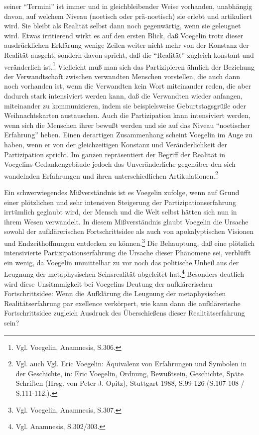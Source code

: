 seiner "`Termini"' ist immer und in gleichbleibender Weise vorhanden,
unabhängig davon, auf welchem Niveau (noetisch oder prä-noetisch) sie
erlebt und artikuliert wird. Sie bleibt als Realität selbst dann noch
gegenwärtig, wenn sie geleugnet wird.  Etwas irritierend wirkt es auf
den ersten Blick, daß Voegelin trotz dieser ausdrücklichen Erklärung
wenige Zeilen weiter nicht mehr von der Konstanz der Realität ausgeht,
sondern davon spricht, daß die "`Realität"' zugleich konstant und
veränderlich ist.\footnote{Vgl. Voegelin, Anamnesis, S.306.}  Vielleicht
muß man sich das Partizipieren ähnlich der Beziehung der Verwandtschaft
zwischen verwandten Menschen vorstellen, die auch dann noch vorhanden
ist, wenn die Verwandten kein Wort miteinander reden, die aber dadurch
stark intensiviert werden kann, daß die Verwandten wieder anfangen,
miteinander zu kommunizieren, indem sie beispielsweise Geburtstagsgrüße
oder Weihnachtskarten austauschen. Auch die Partizipation kann
intensiviert werden, wenn sich die Menschen ihrer bewußt werden und sie
auf das Niveau "`noetischer Erfahrung"' heben.  Einen derartigen
Zusammenhang scheint Voegelin im Auge zu haben, wenn er von der
gleichzeitigen Konstanz und Veränderlichkeit der Partizipation spricht.
Im ganzen repräsentiert der Begriff der Realität in Voegelins
Gedankengebäude jedoch das Unveränderliche gegenüber den sich wandelnden
Erfahrungen und ihren unterschiedlichen Artikulationen.\footnote{Vgl.
  auch Vgl. Eric Voegelin: Äquivalenz von Erfahrungen und Symbolen in
  der Geschichte, in: Eric Voegelin, Ordnung, Bewußtsein, Geschichte,
  Späte Schriften (Hrsg. von Peter J. Opitz), Stuttgart 1988, S.99-126
  (S.107-108 / S.111-112.).}
 
Ein schwerwiegendes Mißverständnis ist es Voegelin zufolge, wenn auf Grund
einer plötzlichen und sehr intensiven Steigerung der Partizipationserfahrung
irrtümlich geglaubt wird, der Mensch und die Welt selbst hätten sich nun in
ihrem Wesen verwandelt. In diesem Mißverständnis glaubt Voegelin die Ursache
sowohl der aufklärerischen Fortschrittsidee als auch von apokalyptischen
Visionen und Endzeithoffnungen entdecken zu können.\footnote{Vgl. Voegelin,
  Anamnesis, S.307.} Die Behauptung, daß eine plötzlich intensivierte
Partizipationserfahrung die Ursache dieser Phänomene sei, verblüfft ein wenig,
da Voegelin unmittelbar zu vor noch das politische Unheil aus der Leugnung der
metaphysischen Seinsrealität abgeleitet hat.\footnote{Vgl. Anamnesis,
  S.302/303.} Besonders deutlich wird diese Unsitmmigkeit bei Voegelins
Deutung der aufklärerischen Fortschrittsidee: Wenn die Aufklärung die Leugnung
der metaphysischen Realitätserfahrung par exellence verkörpert, wie kann dann
die aufklärerische Fortschrittsidee zugleich Ausdruck des Überschießens dieser
Realitätserfahrung sein?
 
